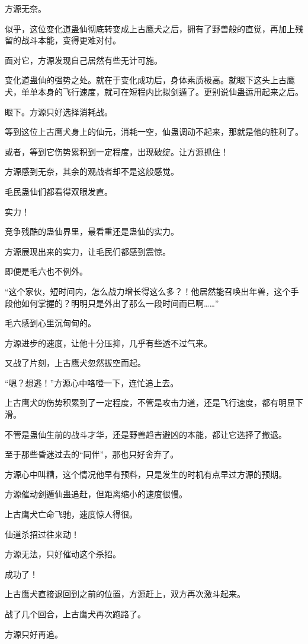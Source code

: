 \begin{this_body}
方源无奈。

似乎，这位变化道蛊仙彻底转变成上古鹰犬之后，拥有了野兽般的直觉，再加上残留的战斗本能，变得更难对付。

面对它，方源发现自己居然有些无计可施。

变化道蛊仙的强势之处。就在于变化成功后，身体素质极高。就眼下这头上古鹰犬，单单本身的飞行速度，就可在短程内比拟剑遁了。更别说仙蛊运用起来之后。

眼下。方源只好选择消耗战。

等到这位上古鹰犬身上的仙元，消耗一空，仙蛊调动不起来，那就是他的胜利了。

或者，等到它伤势累积到一定程度，出现破绽。让方源抓住！

方源感到无奈，其余的观战者却不是这般感觉。

毛民蛊仙们都看得双眼发直。

实力！

竞争残酷的蛊仙界里，最看重还是蛊仙的实力。

方源展现出来的实力，让毛民们都感到震惊。

即便是毛六也不例外。

“这个家伙，短时间内，怎么战力增长得这么多？！他居然能召唤出年兽，这个手段他如何掌握的？明明只是外出了那么一段时间而已啊……”

毛六感到心里沉甸甸的。

方源进步的速度，让他十分压抑，几乎有些透不过气来。

又战了片刻，上古鹰犬忽然拔空而起。

“嗯？想逃！”方源心中咯噔一下，连忙追上去。

上古鹰犬的伤势积累到了一定程度，不管是攻击力道，还是飞行速度，都有明显下滑。

不管是蛊仙生前的战斗才华，还是野兽趋吉避凶的本能，都让它选择了撤退。

至于那些昏迷过去的“同伴”，那也只好舍弃了。

方源心中叫糟，这个情况他早有预料，只是发生的时机有点早过方源的预期。

方源催动剑遁仙蛊追赶，但距离缩小的速度很慢。

上古鹰犬亡命飞驰，速度惊人得很。

仙道杀招过往来动！

方源无法，只好催动这个杀招。

成功了！

上古鹰犬直接退回到之前的位置，方源赶上，双方再次激斗起来。

战了几个回合，上古鹰犬再次跑路了。

方源只好再追。


\end{this_body}
